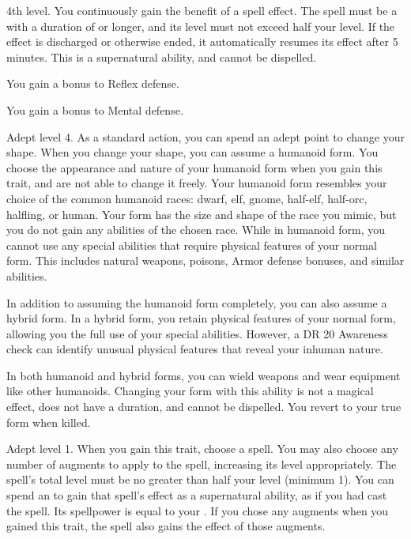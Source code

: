     \featpre 4th level.
    \featben You continuously gain the benefit of a spell effect.
    The spell must be a  with a duration of \durshort or longer, and its level must not exceed half your level.
    If the effect is discharged or otherwise ended, it automatically resumes its effect after 5 minutes.
    This is a supernatural ability, and cannot be dispelled.

    \featben You gain a  bonus to Reflex defense.

    \featben You gain a  bonus to Mental defense.

    \featpre Adept level 4.
    \featben As a standard action, you can spend an adept point to change your shape.
    When you change your shape, you can assume a humanoid form.
    You choose the appearance and nature of your humanoid form when you gain this trait, and are not able to change it freely.
    Your humanoid form resembles your choice of the common humanoid races: dwarf, elf, gnome, half-elf, half-orc, halfling, or human.
    Your form has the size and shape of the race you mimic, but you do not gain any abilities of the chosen race.
    While in humanoid form, you cannot use any special abilities that require physical features of your normal form.
    This includes natural weapons, poisons, Armor defense bonuses, and similar abilities.

    In addition to assuming the humanoid form completely, you can also assume a hybrid form.
    In a hybrid form, you retain physical features of your normal form, allowing you the full use of your special abilities.
    However, a DR 20 Awareness check can identify unusual physical features that reveal your inhuman nature.

    In both humanoid and hybrid forms, you can wield weapons and wear equipment like other humanoids.
    Changing your form with this ability is not a magical effect, does not have a duration, and cannot be dispelled.
    You revert to your true form when killed.

    \featpre Adept level 1.
    \featben When you gain this trait, choose a spell.
    You may also choose any number of augments to apply to the spell, increasing its level appropriately.
    The spell's total level must be no greater than half your level (minimum 1).
    You can spend an  to gain that spell's effect as a supernatural ability, as if you had cast the spell.
    Its spellpower is equal to your .
    If you chose any augments when you gained this trait, the spell also gains the effect of those augments.

